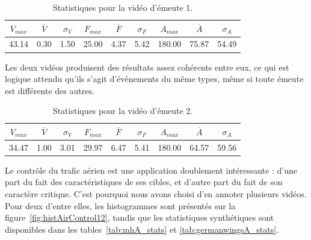 \begin{table}
	\centering
	\begin{tabular}{c c c c c c c c c}
		$V_{max}$	& $\overline{V}$	& $\sigma_{V}$	& $F_{max}$	& $\overline{F}$	& $\sigma_{F}$	& $A_{max}$	& $\overline{A}$	& $\sigma_{A}$	\bigstrut[b] \\ \hline

		43.14		& 0.30				& 1.50			& 25.00		& 4.37				& 5.42			& 180.00	& 75.87				& 54.49			\bigstrut[t] \\
	\end{tabular}
	\caption[Statistiques pour la vidéo d'émeute 1]{Statistiques pour la vidéo d'émeute 1.}
	\label{tab:riot_stats}
\end{table}

	Les deux vidéos produisent des résultats assez cohérents entre eux, ce qui est logique attendu qu'ils s'agit d'événements du même types, même si toute émeute est différente des autres.

\begin{table}
	\centering
	\begin{tabular}{c c c c c c c c c}
		$V_{max}$	& $\overline{V}$	& $\sigma_{V}$	& $F_{max}$	& $\overline{F}$	& $\sigma_{F}$	& $A_{max}$	& $\overline{A}$	& $\sigma_{A}$	\bigstrut[b] \\ \hline

		34.47		& 1.00				& 3.01			& 29.97		& 6.47				& 5.41			& 180.00	& 64.57				& 59.56			\bigstrut[t] \\
	\end{tabular}
	\caption[Statistiques pour la vidéo d'émeute 2]{Statistiques pour la vidéo d'émeute 2.}
	\label{tab:riot2a_stats}
\end{table}

	Le contrôle du trafic aérien est une application doublement intéressante : d'une part du fait des caractéristiques de ses cibles, et d'autre part du fait de son caractère critique. C'est pourquoi nous avons choisi d'en annoter plusieurs vidéos. Pour deux d'entre elles, les histogrammes sont présentés sur la figure~\ref{fig:histAirControl12}, tandis que les statistiques synthétiques sont disponibles dans les tables~\ref{tab:mhA_stats} et \ref{tab:germanwingsA_stats}.
	
